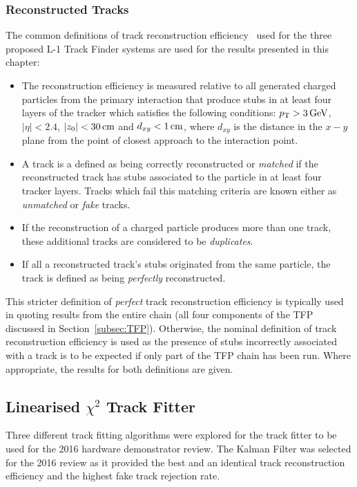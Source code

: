 \subsubsection{Reconstructed Tracks}
The common definitions of track reconstruction efficiency~\cite{TMTT_JINST} used for the three proposed L-1 Track Finder systems are used for the results presented in this chapter:

\begin{itemize}
\item The reconstruction efficiency is measured relative to all generated charged particles from the primary interaction that produce stubs in at least four layers of the tracker which satisfies the following conditions: $p_{\mathrm{T}} > 3\,\text{Ge\hspace{-.08em}V}$, $|\eta| < 2.4$, $|z_{0}| < 30\,\text{cm}$ and $d_{xy} < 1\,\text{cm}$, where $d_{xy}$ is the distance in the $x-y$ plane from the point of closest approach to the interaction point.
\item A track is a defined as being correctly reconstructed or \emph{matched} if the reconstructed track has stubs associated to the particle in at least four tracker layers. Tracks which fail this matching criteria are known either as \emph{unmatched} or \emph{fake} tracks.
\item If the reconstruction of a charged particle produces more than one track, these additional tracks are considered to be \emph{duplicates}.
\item If all a reconstructed track's stubs originated from the same particle, the track is defined as being \emph{perfectly} reconstructed. 
\end{itemize}

This stricter definition of \emph{perfect} track reconstruction efficiency is typically used in quoting results from the entire chain (\ie all four components of the TFP discussed in Section~\ref{subsec:TFP}).
Otherwise, the nominal definition of track reconstruction efficiency is used as the presence of stubs incorrectly associated with a track is to be expected if only part of the TFP chain has been run.
Where appropriate, the results for both definitions are given.


\subsection{Linearised $\chi^{2}$ Track Fitter}\label{subsec:chi2}

Three different track fitting algorithms were explored for the track fitter to be used for the 2016 hardware demonstrator review.
The Kalman Filter was selected for the 2016 review as it provided the best and an identical track reconstruction efficiency and the highest fake track rejection rate.

